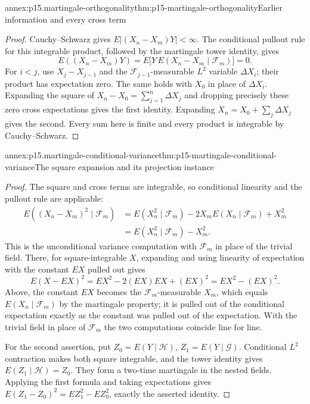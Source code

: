 \begin{annexitem}{annex:p15.martingale-orthogonality}{thm:p15-martingale-orthogonality}{Earlier information and every cross term}
\begin{proof}
Cauchy--Schwarz gives \(E|(X_n-X_m)Y|<\infty\).
The conditional pullout rule for this integrable product, followed
by the martingale tower identity, gives
\[
 E((X_n-X_m)Y)
      =E\bigl[Y\,E(X_n-X_m\mid\mathcal F_m)\bigr]=0.
\]
For \(i<j\), use \(X_j-X_{j-1}\) and the
\(\mathcal F_{j-1}\)-measurable \(L^2\) variable \(\Delta X_i\);
their product has expectation zero.
The same holds with \(X_0\) in place of \(\Delta X_i\).
Expanding the square of
\(X_n-X_0=\sum_{j=1}^n\Delta X_j\) and dropping precisely these
zero cross expectations gives the first identity.
Expanding \(X_n=X_0+\sum_j\Delta X_j\) gives the second.
Every sum here is finite and every product is integrable by
Cauchy--Schwarz.
\end{proof}
\end{annexitem}

\begin{annexitem}{annex:p15.martingale-conditional-variance}{thm:p15-martingale-conditional-variance}{The square expansion and its projection instance}
\begin{proof}
The square and cross terms are integrable, so conditional linearity
and the pullout rule are applicable:
\[
 \begin{aligned}
 E((X_n-X_m)^2\mid\mathcal F_m)
   &=E(X_n^2\mid\mathcal F_m)
       -2X_mE(X_n\mid\mathcal F_m)+X_m^2\\
   &=E(X_n^2\mid\mathcal F_m)-X_m^2.
 \end{aligned}
\]
This is the unconditional variance computation with \(\mathcal F_m\)
in place of the trivial field. There, for square-integrable \(X\),
expanding and using linearity of expectation with the constant \(EX\)
pulled out gives
\[
 E(X-EX)^2=EX^2-2(EX)EX+(EX)^2=EX^2-(EX)^2 .
\]
Above, the constant \(EX\) becomes the \(\mathcal F_m\)-measurable
\(X_m\), which equals \(E(X_n\mid\mathcal F_m)\) by the martingale
property; it is pulled out of the conditional expectation exactly as
the constant was pulled out of the expectation. With the trivial field
in place of \(\mathcal F_m\) the two computations coincide line for line.

For the second assertion, put \(Z_0=E(Y\mid\mathcal H)\),
\(Z_1=E(Y\mid\mathcal G)\).
Conditional \(L^2\) contraction makes both square integrable, and
the tower identity gives \(E(Z_1\mid\mathcal H)=Z_0\).
They form a two-time martingale in the nested fields.
Applying the first formula and taking expectations gives
\(E(Z_1-Z_0)^2=EZ_1^2-EZ_0^2\), exactly the asserted identity.
\end{proof}
\end{annexitem}

